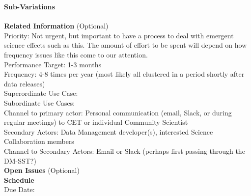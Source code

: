 {\bf Sub-Variations} \\
\\

{\bf Related Information} (Optional) \\
Priority: Not urgent, but important to have a process to deal with emergent science effects such as this.  The amount of effort to be spent will depend on how frequency issues like this come to our attention. \\
Performance Target: 1-3 months \\
Frequency: 4-8 times per year (most likely all clustered in a period shortly after data releases) \\
Superordinate Use Case:  \\
Subordinate Use Cases: \\
Channel to primary actor: Personal communication (email, Slack, or during regular meetings) to CET or individual Community Scientist \\
Secondary Actors: Data Management developer(s), interested Science Collaboration members \\
Channel to Secondary Actors: Email or Slack (perhaps first passing through the DM-SST?) \\

{\bf Open Issues} (Optional) \\

{\bf Schedule} \\
Due Date: \\
